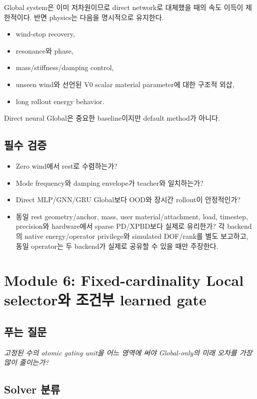 \documentclass[11pt,a4paper]{article}
\begin{document}
Global system은 이미 저차원이므로 direct network로 대체했을 때의 속도 이득이 제한적이다.
반면 physics는 다음을 명시적으로 유지한다.

\begin{itemize}[leftmargin=1.5em]
  \item wind-stop recovery,
  \item resonance와 phase,
  \item mass/stiffness/damping control,
  \item unseen wind와 선언된 V0 scalar material parameter에 대한 구조적 외삽,
  \item long rollout energy behavior.
\end{itemize}

Direct neural Global은 중요한 baseline이지만 default method가 아니다.

\subsection*{필수 검증}

\begin{itemize}[leftmargin=1.5em]
  \item Zero wind에서 rest로 수렴하는가?
  \item Mode frequency와 damping envelope가 teacher와 일치하는가?
  \item Direct MLP/GNN/GRU Global보다 OOD와 장시간 rollout이 안정적인가?
  \item 동일 rest geometry/anchor, mass, user material/attachment, load, timestep,
  precision와 hardware에서 sparse PD/XPBD보다 실제로 유리한가?
  각 backend의 native energy/operator privilege와 simulated DOF/rank를 별도 보고하고,
  동일 operator는 두 backend가 실제로 공유할 수 있을 때만 주장한다.
\end{itemize}

\section{Module 6: Fixed-cardinality Local selector와 조건부 learned gate}

\subsection*{푸는 질문}

\emph{고정된 수의 atomic gating unit을 어느 영역에 써야 Global-only의 미래 오차를 가장 많이 줄이는가?}

\subsection*{Solver 분류}
\end{document}
